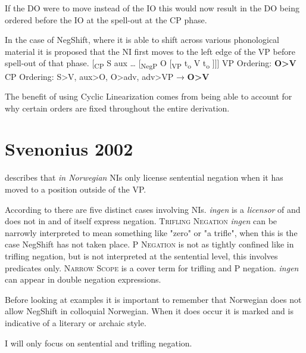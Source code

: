 \documentclass[12pt, letterpaper]{article}
\begin{document}
\ex If the DO were to move instead of the IO this would now result in the DO being ordered before the IO at the spell-out at the CP phase. 

\ex In the case of NegShift, where it is able to shift across various phonological material it is proposed that the NI first moves to the left edge of the VP before spell-out of that phase. 
\vspace{6pt}
	\ea {}[\textsubscript{CP} S aux … [\textsubscript{NegP} O [\textsubscript{VP} t\textsubscript{o}  V t\textsubscript{o} ]]]
	\ex VP Ordering: \textbf{O>V}\\
	CP Ordering: S>V, aux>O, O>adv, adv>VP → \textbf{O>V}
	\z

\ex The benefit of using Cyclic Linearization comes from being able to account for why certain orders are fixed throughout the entire derivation.
\z 

\section*{Svenonius 2002}

\ea	\citet{svenoniusStrainsNegationNorwegian2002} describes that \emph{in Norwegian} NIs only license sentential negation when it has moved to a position outside of the VP. 

\ex According to \citeauthor{svenoniusStrainsNegationNorwegian2002} there are five distinct cases involving NIs.
	\ea \emph{ingen} is a \emph{licensor} of and does not in and of itself express negation.
	\ex \textsc{Trifling Negation} \emph{ingen} can be narrowly interpreted to mean something like "zero" or "a trifle", when this is the case NegShift has not taken place. 
	\ex \textsc{P Negation} is not as tightly confined like in trifling negation, but is not interpreted at the sentential level, this involves predicates only. 
	\ex \textsc{Narrow Scope} is a cover term for trifling and P negation. 
	\ex \emph{ingen} can appear in double negation expressions.
	\z 

\ex Before looking at examples it is important to remember that Norwegian does not allow NegShift in colloquial Norwegian. 
	\ea When it does occur it is marked and is indicative of a literary or archaic style. 
	\z 

\ex I will only focus on sentential and trifling negation. 
\end{document}
